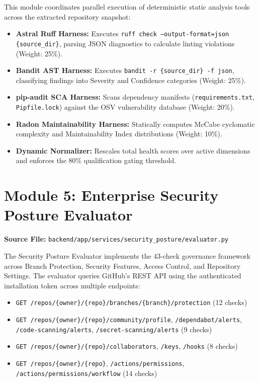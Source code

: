 This module coordinates parallel execution of deterministic static analysis tools across the extracted repository snapshot:
\begin{itemize}
    \item \textbf{Astral Ruff Harness:} Executes \texttt{ruff check --output-format=json \{source\_dir\}}, parsing JSON diagnostics to calculate linting violations (Weight: 25\%).
    \item \textbf{Bandit AST Harness:} Executes \texttt{bandit -r \{source\_dir\} -f json}, classifying findings into Severity and Confidence categories (Weight: 25\%).
    \item \textbf{pip-audit SCA Harness:} Scans dependency manifests (\texttt{requirements.txt}, \texttt{Pipfile.lock}) against the OSV vulnerability database (Weight: 20\%).
    \item \textbf{Radon Maintainability Harness:} Statically computes McCabe cyclomatic complexity and Maintainability Index distributions (Weight: 10\%).
    \item \textbf{Dynamic Normalizer:} Rescales total health scores over active dimensions and enforces the 80\% qualification gating threshold.
\end{itemize}

\section{Module 5: Enterprise Security Posture Evaluator}
\label{sec:impl-posture-eval}

\noindent\textbf{Source File:} \texttt{backend/app/services/security\_posture/evaluator.py}

The Security Posture Evaluator implements the 43-check governance framework across Branch Protection, Security Features, Access Control, and Repository Settings. The evaluator queries GitHub's REST API using the authenticated installation token across multiple endpoints:
\begin{itemize}
    \item \texttt{GET /repos/\{owner\}/\{repo\}/branches/\{branch\}/protection} (12 checks)
    \item \texttt{GET /repos/\{owner\}/\{repo\}/community/profile}, \texttt{/dependabot/alerts}, \texttt{/code-scanning/alerts}, \texttt{/secret-scanning/alerts} (9 checks)
    \item \texttt{GET /repos/\{owner\}/\{repo\}/collaborators}, \texttt{/keys}, \texttt{/hooks} (8 checks)
    \item \texttt{GET /repos/\{owner\}/\{repo\}}, \texttt{/actions/permissions}, \texttt{/actions/permissions/workflow} (14 checks)
\end{itemize}

